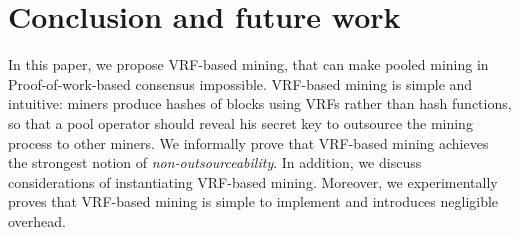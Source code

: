 \section{Conclusion and future work}
\label{sec:conclusion}

In this paper, we propose VRF-based mining, that can make pooled mining in Proof-of-work-based consensus impossible.
VRF-based mining is simple and intuitive: miners produce hashes of blocks using VRFs rather than hash functions, so that a pool operator should reveal his secret key to outsource the mining process to other miners.
We informally prove that VRF-based mining achieves the strongest notion of \emph{non-outsourceability}.
In addition, we discuss considerations of instantiating VRF-based mining.
Moreover, we experimentally proves that VRF-based mining is simple to implement and introduces negligible overhead.